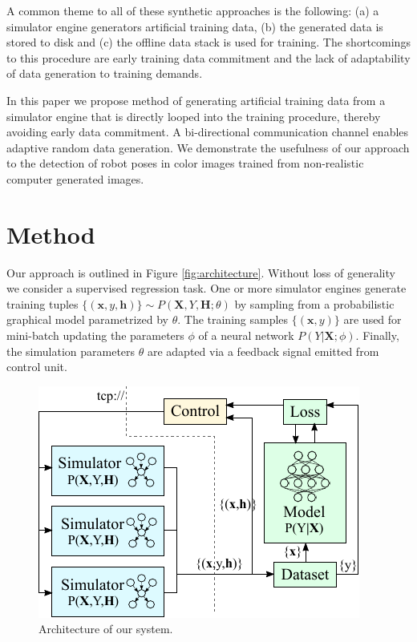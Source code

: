 \documentclass[conference]{IEEEtran}
\begin{document}
A common theme to all of these synthetic approaches is the following: (a) a simulator engine generators artificial training data, (b) the generated data is stored to disk and (c) the offline data stack is used for training. The shortcomings to this procedure are early training data commitment and the lack of adaptability of data generation to training demands.

In this paper we propose method of generating artificial training data from a simulator engine that is directly looped into the training procedure, thereby avoiding early data commitment. A bi-directional communication channel enables adaptive random data generation. We demonstrate the usefulness of our approach to the detection of robot poses in color images trained from non-realistic computer generated images.




\section{Method}

    Our approach is outlined in Figure \ref{fig:architecture}. Without loss of generality we consider a supervised regression task. One or more simulator engines generate training tuples $\{(\textbf{x},y,\textbf{h})\} \sim P(\textbf{X},Y,\textbf{H};\theta)$ by sampling from a probabilistic graphical model parametrized by $\theta$. The training samples $\{(\textbf{x},y)\}$ are used for mini-batch updating the parameters $\phi$ of a neural network $P(Y \lvert \textbf{X};\phi)$. Finally, the simulation parameters $\theta$ are adapted via a feedback signal emitted from control unit.

    \begin{figure}[htbp]
        \centerline{\includegraphics[width=0.9\columnwidth]{figures/architecture/overview.pdf}}
        \caption{\label{fig:architecture} Architecture of our system.}
        \label{fig}
    \end{figure}
\end{document}
